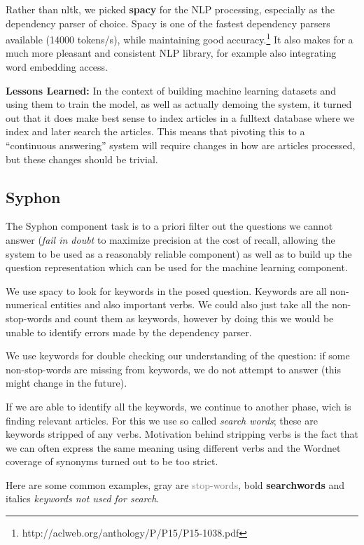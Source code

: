 \documentclass[11pt,a4paper]{article}
\begin{document}
Rather than nltk, we picked \textbf{spacy} for the NLP processing,
especially as the dependency parser of choice. Spacy is one of
the fastest dependency parsers available (14000 tokens/s), while maintaining good accuracy.\footnote{http://aclweb.org/anthology/P/P15/P15-1038.pdf}
It also makes for a much more pleasant and consistent NLP library,
for example also integrating word embedding access.

\textbf{Lessons Learned:} In the context of building machine learning datasets and using them
to train the model, as well as actually demoing the system, it turned out
that it does make best sense to index articles in a fulltext database
where we index and later search the articles.  This means that pivoting
this to a ``continuous answering'' system will require changes in how are
articles processed, but these changes should be trivial.

\subsection{Syphon}

The Syphon component task is to a priori filter out the questions we
cannot answer (\textit{fail in doubt} to maximize precision at the cost of recall, allowing
the system to be used as a reasonably reliable component) as well
as to build up the question representation which can be used for
the machine learning component.

We use spacy to look for keywords in the posed question. Keywords are all non-numerical entities and also important verbs. We could also just take all the non-stop-words and count them as keywords, however by doing this we would be unable to identify errors made by the dependency parser.

We use keywords for double checking our understanding of the question: if some non-stop-words are missing from keywords, we do not attempt to answer (this might change in the future).

If we are able to identify all the keywords, we continue to another phase, wich is finding relevant articles.
For this we use so called \textit{search words}; these are keywords stripped of any verbs.
Motivation behind stripping verbs is the fact that we can often express the same meaning using different verbs
and the Wordnet coverage of synonyms turned out to be too strict.

Here are some common examples, gray are \textcolor{gray}{stop-words}, bold \textbf{searchwords} and italics \textit{keywords not used for search}.
\end{document}
